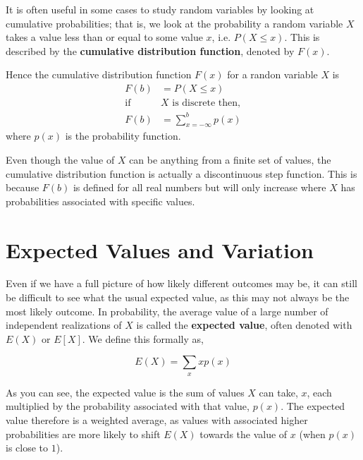 It is often useful in some cases to study random variables by looking at cumulative probabilities; that is, we
look at the probability a random variable $X$ takes a value less than or equal to some value $x$, i.e. $P(X\leq x)$.
This is described by the \textbf{cumulative distribution function}, denoted by $F(x)$.\newline \par

Hence the cumulative distribution function $F(x)$ for a randon variable $X$ is
\begin{align*}
	F(b)&=P(X\leq x) \\
	\textrm{if }&X\textrm{ is discrete then,} \\
	F(b)&=\sum_{x=-\infty}^{b}p(x)
\end{align*}
where $p(x)$ is the probability function.\newline \par

Even though the value of $X$ can be anything from a finite set of values, the cumulative distribution function
is actually a discontinuous step function. This is because $F(b)$ is defined for
all real numbers but will only increase where $X$ has probabilities associated with specific values.\newline

\section{Expected Values and Variation}

Even if we have a full picture of how likely different outcomes may be, it can still be difficult to see
what the usual expected value, as this may not always be the most likely outcome. In probability, the average
value of a large number of independent realizations of $X$ is called the \textbf{expected value}, often denoted
with $E(X)$ or $E[X]$. We define this formally as,

\begin{equation*}
	E(X) = \sum_{x}xp(x)
\end{equation*}

As you can see, the expected value is the sum of values $X$ can take, $x$, each multiplied by the probability associated with that value, $p(x)$.
The expected value therefore is a weighted average, as values with associated higher probabilities are more likely
to shift $E(X)$ towards the value of $x$ (when $p(x)$ is close to $1$).\newline \par

